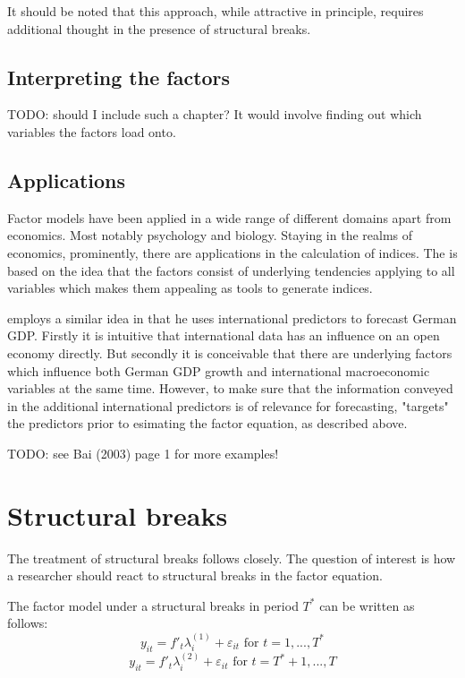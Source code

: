 \documentclass[11pt]{article}
\begin{document}
It should be noted that this approach, while attractive in principle, requires additional thought in the presence of structural breaks.


\subsection{Interpreting the factors}
TODO: should I include such a chapter? It would involve finding out which variables the factors load onto.

\subsection{Applications}
Factor models have been applied in a wide range of different domains apart from economics. Most notably psychology and biology. Staying in the realms of economics, prominently, there are applications in the calculation of indices. The is based on the idea that the factors consist of underlying tendencies applying to all variables which makes them appealing as tools to generate indices.

\citet{schumacher2010factor} employs a similar idea in that he uses international predictors to forecast German GDP. Firstly it is intuitive that international data has an influence on an open economy directly. But secondly it is conceivable that there are underlying factors which influence both German GDP growth and international macroeconomic variables at the same time. However, to make sure that the information conveyed in the additional international predictors is of relevance for forecasting, \citet{schumacher2010factor} "targets" the predictors prior to esimating the factor equation, as described above.


TODO: see Bai (2003) page 1 for more examples!

\section{Structural breaks}
The treatment of structural breaks follows \citet{breitung2011testing} closely. The question of interest is how a researcher should react to structural breaks in the factor equation.

The factor model under a structural breaks in period $T^*$ can be written as follows:
\begin{equation}
	\label{}
	y_{it} = f'_t\lambda_i^{(1)} + \varepsilon_{it} \text{ for } t = 1, ..., T^*
\end{equation}
\begin{equation}
	\label{}
	y_{it} = f'_t\lambda_i^{(2)} + \varepsilon_{it} \text{ for } t = T^* + 1, ..., T
\end{equation}
\end{document}
